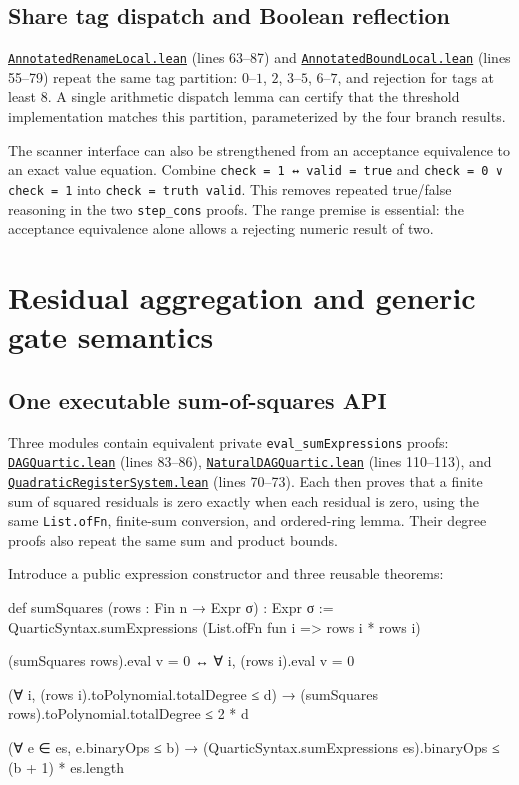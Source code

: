 \documentclass[11pt,letterpaper]{article}
\newcommand{\code}[1]{\nolinkurl{#1}}
\newcommand{\src}[2]{\href{https://github.com/VladimirReshetnikov/ProveIt/blob/60e9c5d620c6c387d932876cfa2d9376f64ea56c/Computability/DiophantineConsistency/Lean/DiophantineConsistency/#1.lean}{\nolinkurl{#1.lean}} (lines #2)}
\begin{document}
\subsection{Share tag dispatch and Boolean reflection}

\src{AnnotatedRenameLocal}{63--87} and
\src{AnnotatedBoundLocal}{55--79} repeat the same tag partition:
\(0\)--\(1\), \(2\), \(3\)--\(5\), \(6\)--\(7\), and rejection for
tags at least \(8\). A single arithmetic dispatch lemma can certify that
the threshold implementation matches this partition, parameterized by
the four branch results.

The scanner interface can also be strengthened from an acceptance
equivalence to an exact value equation. Combine
\code{check = 1 ↔ valid = true} and
\code{check = 0 ∨ check = 1} into \code{check = truth valid}.
This removes repeated true/false reasoning in the two \code{step_cons}
proofs. The range premise is essential: the acceptance equivalence alone
allows a rejecting numeric result of two.

\section{Residual aggregation and generic gate semantics}

\subsection{One executable sum-of-squares API}

Three modules contain equivalent private
\code{eval_sumExpressions} proofs:
\src{DAGQuartic}{83--86}, \src{NaturalDAGQuartic}{110--113}, and
\src{QuadraticRegisterSystem}{70--73}. Each then proves that a finite
sum of squared residuals is zero exactly when each residual is zero,
using the same \code{List.ofFn}, finite-sum conversion, and ordered-ring
lemma. Their degree proofs also repeat the same sum and product bounds.

Introduce a public expression constructor and three reusable theorems:
\begin{Lean}
def sumSquares (rows : Fin n → Expr σ) : Expr σ :=
  QuarticSyntax.sumExpressions
    (List.ofFn fun i => rows i * rows i)

(sumSquares rows).eval v = 0 ↔
  ∀ i, (rows i).eval v = 0

(∀ i, (rows i).toPolynomial.totalDegree ≤ d) →
  (sumSquares rows).toPolynomial.totalDegree ≤ 2 * d

(∀ e ∈ es, e.binaryOps ≤ b) →
  (QuarticSyntax.sumExpressions es).binaryOps ≤
    (b + 1) * es.length
\end{Lean}
\end{document}
